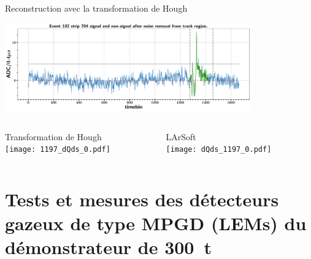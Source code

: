     \begin{frame}{Reconstruction avec la transformation de Hough}
        \begin{scriptsize}
            \begin{center} \includegraphics[width=0.8\textwidth]{./pictures/cnsub_fromtrack.pdf} \end{center}
            \begin{columns}
                \begin{column}{0.6\textwidth}
                    Transformation de Hough\\
                    \texttt{[image: 1197\_dQds\_0.pdf]}
                \end{column}
                \begin{column}{0.4\textwidth}
                    LArSoft\\
                    \texttt{[image: dQds\_1197\_0.pdf]}
                \end{column}
            \end{columns}
        \end{scriptsize}
    \end{frame}
    
    \section[Tests des LEMs]{Tests et mesures des détecteurs gazeux de type MPGD (LEMs) du démonstrateur de \SI{300}{\tonne}}

    {
        \begin{specialframe}
            \vspace{2cm}\hspace*{-1.8cm}\parbox[t]{\textwidth}{
                \begin{center}
                    \begin{Huge}
                            \textcolor{pheniics_purple}{\textbf{\insertsection}}
                    \end{Huge}
                \end{center}
            }
        \end{specialframe}
    }

